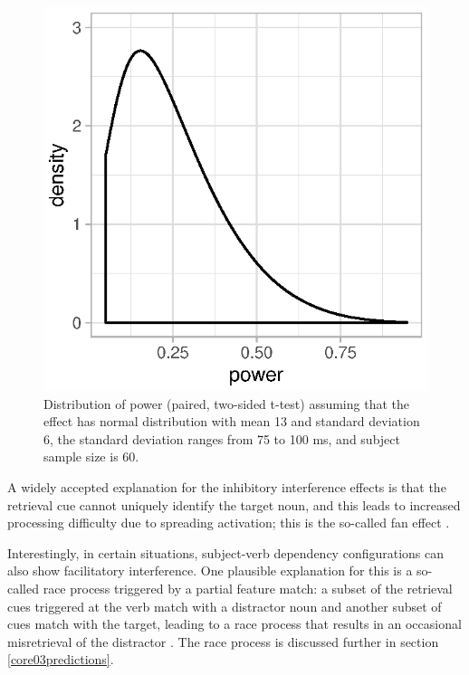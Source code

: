 \documentclass{cambridge7A}\usepackage[]{graphicx}\usepackage[]{color}
\makeatletter
\def\maxwidth{ %
  \ifdim\Gin@nat@width>\linewidth
    \linewidth
  \else
    \Gin@nat@width
  \fi
}
\newenvironment{knitrout}{}{} %
\makeatother
\begin{document}
\begin{figure}[!htbp]
\centering
\begin{knitrout}
\color{fgcolor}

{\centering \includegraphics[width=\maxwidth]{figures/fig-powercalcintvandyke-1} 

}



\end{knitrout}
\caption{Distribution of power (paired, two-sided t-test) assuming that the effect has normal distribution  with mean 13 and standard deviation 6, the standard deviation ranges from 75 to 100 ms, and subject sample size is 60.}\label{fig:powerdistrnvandyke}
\end{figure} 


A widely accepted explanation  for  the inhibitory interference effects  is that the retrieval cue cannot uniquely identify the target noun,  and this leads to increased processing difficulty due to  spreading activation; this is the so-called  fan effect \citep{AndersonEtAl2004}. 

Interestingly, in certain situations, subject-verb dependency configurations can also show facilitatory interference. One plausible explanation for this is a so-called  race process \citep{raab1962division} triggered by a  partial feature match: a subset of the retrieval cues triggered at the verb match with a distractor noun and another subset of cues match with the target, leading to a race process that results in an occasional  misretrieval of the distractor \citep{LogacevMultiple,NicenboimRetrieval2018}. The race process is discussed further in section \ref{core03predictions}.
\end{document}
